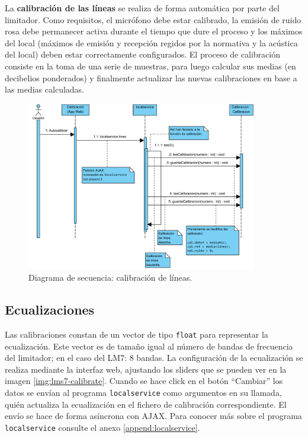 La \textbf{calibración de las líneas} se realiza de forma automática por parte del limitador. Como requisitos, el micrófono debe estar calibrado, la emisión de ruido rosa debe permanecer activa durante el tiempo que dure el proceso y los máximos del local (máximos de emisión y recepción regidos por la normativa y la acústica del local) deben estar correctamente configurados. \newline
El proceso de calibración consiste en la toma de una serie de muestras, para luego calcular sus medias (en decibelios ponderados) y finalmente actualizar las nuevas calibraciones en base a las medias calculadas.

\begin{figure}[h]
    \centering
    \includegraphics[width=0.9\textwidth]{figuras/lms7-calibrate-lines.pdf}
    \caption{Diagrama de secuencia: calibración de líneas.}
    \label{fig:lms7-calibrate-lines}
\end{figure}

\subsection{Ecualizaciones}

Las calibraciones constan de un vector de tipo \verb|float| para representar la ecualización. Este vector es de tamaño igual al número de bandas de frecuencia del limitador; en el caso del LM7: 8 bandas. La configuración de la ecualización se realiza mediante la interfaz web, ajustando los sliders que se pueden ver en la imagen \ref{img:lms7-calibrate}. Cuando se hace click en el botón ``Cambiar'' los datos se envían al programa \verb|localservice| como argumentos en su llamada, quién actualiza la ecualización en el fichero de calibración correspondiente. El envío se hace de forma asíncrona con AJAX. Para conocer más sobre el programa \verb|localservice| consulte el anexo \ref{append:localservice}.

